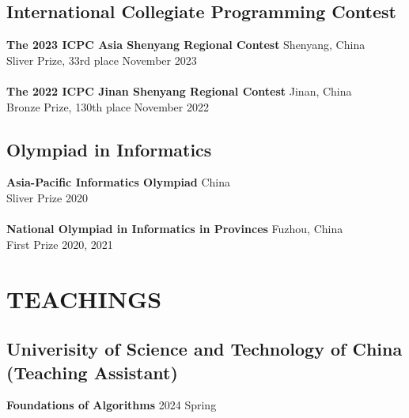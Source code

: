 \documentclass[a4paper,9pt]{extarticle}
\begin{document}
\subsection*{International Collegiate Programming Contest}
\textbf{The 2023 ICPC Asia Shenyang Regional Contest}  \hfill Shenyang, China\\ 
Sliver Prize, 33rd place \hfill November 2023\\ \\
\textbf{The 2022 ICPC Jinan Shenyang Regional Contest}  \hfill Jinan, China\\ 
Bronze Prize, 130th place \hfill November 2022\\

\subsection*{Olympiad in Informatics}
\textbf{Asia-Pacific Informatics Olympiad}  \hfill China\\ 
Sliver Prize \hfill 2020\\ \\
\textbf{National Olympiad in Informatics in Provinces}  \hfill Fuzhou, China\\ 
First Prize \hfill 2020, 2021\\

\section*{TEACHINGS}
\subsection*{Univerisity of Science and Technology of China (Teaching Assistant)}
\textbf{Foundations of Algorithms}  \hfill 2024 Spring\\ %


\end{document}

